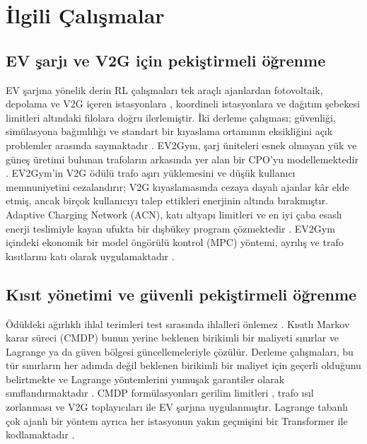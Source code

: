 \section{İlgili Çalışmalar}\label{sec:related}

\subsection{EV şarjı ve V2G için pekiştirmeli öğrenme}\label{sec:rw-rl}

EV şarjına yönelik derin RL çalışmaları tek araçlı ajanlardan \cite{li2020constrained} fotovoltaik, depolama ve V2G içeren istasyonlara \cite{korkas2024distributed,zhang2025dumes}, koordineli istasyonlara \cite{song2025longterm} ve dağıtım şebekesi limitleri altındaki filolara \cite{zhang2024hamlet,caballe2026largescale} doğru ilerlemiştir.
İki derleme çalışması; güvenliği, simülasyona bağımlılığı ve standart bir kıyaslama ortamının eksikliğini açık problemler arasında saymaktadır \cite{qiu2023reinforcement,michailidis2025reinforcement}.
EV2Gym, şarj üniteleri esnek olmayan yük ve güneş üretimi bulunan trafoların arkasında yer alan bir CPO'yu modellemektedir \cite{orfanoudakis2025ev2gym}.
EV2Gym'in V2G ödülü trafo aşırı yüklemesini ve düşük kullanıcı memnuniyetini cezalandırır; V2G kıyaslamasında cezaya dayalı ajanlar kâr elde etmiş, ancak birçok kullanıcıyı talep ettikleri enerjinin altında bırakmıştır.
Adaptive Charging Network (ACN), katı altyapı limitleri ve en iyi çaba esaslı enerji teslimiyle kayan ufukta bir dışbükey program çözmektedir \cite{lee2021adaptive}.
EV2Gym içindeki ekonomik bir model öngörülü kontrol (MPC) yöntemi, ayrılış ve trafo kısıtlarını katı olarak uygulamaktadır \cite{diazlondono2026open}.

\subsection{Kısıt yönetimi ve güvenli pekiştirmeli öğrenme}\label{sec:rw-safe}

Ödüldeki ağırlıklı ihlal terimleri test sırasında ihlalleri önlemez \cite{tabas2022computationally,orfanoudakis2025ev2gym}.
Kısıtlı Markov karar süreci (CMDP) bunun yerine beklenen birikimli bir maliyeti sınırlar \cite{altman2021constrained} ve Lagrange \cite{tessler2018reward} ya da güven bölgesi \cite{achiam2017constrained} güncellemeleriyle çözülür.
Derleme çalışmaları, bu tür sınırların her adımda değil beklenen birikimli bir maliyet için geçerli olduğunu belirtmekte \cite{gu2024review} ve Lagrange yöntemlerini yumuşak garantiler olarak sınıflandırmaktadır \cite{su2025review}.
CMDP formülasyonları gerilim limitleri \cite{fan2024safety}, trafo ısıl zorlanması \cite{zhang2025modelfree,zhang2026safe} ve V2G toplayıcıları \cite{eland2026safe} ile EV şarjına uygulanmıştır.
Lagrange tabanlı çok ajanlı bir yöntem ayrıca her istasyonun yakın geçmişini bir Transformer ile kodlamaktadır \cite{huang2026safe}.

